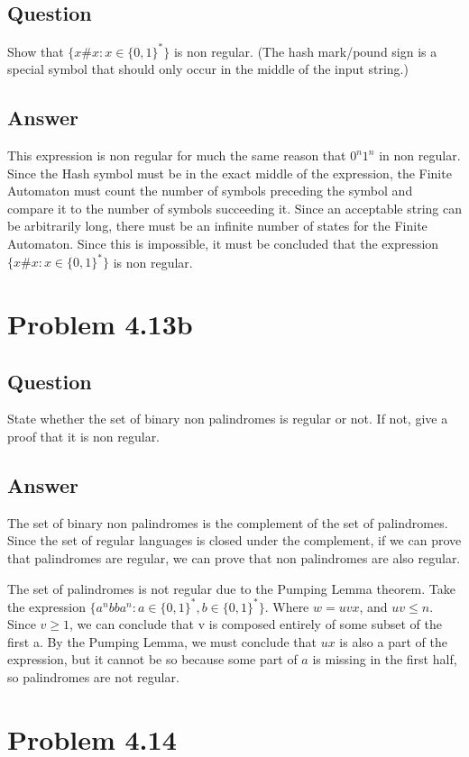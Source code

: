 \documentclass[12pt, a4paper]{article}
\begin{document}
\subsection{Question}
Show that $\{x\#x : x \in \{0,1\}^{*}\}$ is non regular. (The hash mark/pound sign is a special symbol that should only occur in the middle of the input string.)
\subsection{Answer}
This expression is non regular for much the same reason that $0^{n}1^{n}$ in non regular. Since the Hash symbol must be in the exact middle of the expression, the Finite Automaton must count the number of symbols preceding the symbol and compare it to the number of symbols succeeding it. Since an acceptable string can be arbitrarily long, there must be an infinite number of states for the Finite Automaton. Since this is impossible, it must be concluded that the expression $\{x\#x : x \in \{0,1\}^{*}\}$ is non regular.

\section{Problem 4.13b}
\subsection{Question}
State whether the set of binary non palindromes is regular or not. If not, give a proof that it is non regular.
\subsection{Answer}
The set of binary non palindromes is the complement of the set of palindromes. Since the set of regular languages is closed under the complement, if we can prove that palindromes are regular, we can prove that non palindromes are also regular.

The set of palindromes is not regular due to the Pumping Lemma theorem. Take the expression $\{a^{n}bba^{n} : a \in \{0,1\}^{*}, b \in \{0,1\}^{*}\}$. Where $w=uvx$, and $uv \leq n$. Since $v \geq 1$, we can conclude that v is composed entirely of some subset of the first a. By the Pumping Lemma, we must conclude that $ux$ is also a part of the expression, but it cannot be so because some part of $a$ is missing in the first half, so palindromes are not regular.

\section{Problem 4.14}
\end{document}
